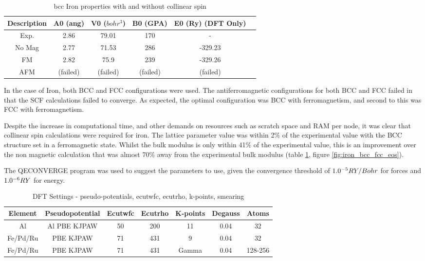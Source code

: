 \begin{table}[h]
\begin{center}
\renewcommand{\arraystretch}{1.2}
\begin{tabular}{c c c c c c}
\hline\hline
Description & A0 (ang) & V0 ($bohr^3$) & B0 (GPA) & E0 (Ry) (DFT Only) \\
\hline\hline
Exp. & 2.86 & 79.01 & 170 & - \\
No Mag & 2.77 & 71.53 & 286 & -329.23 \\
FM & 2.82 & 75.9 & 239 & -329.26 \\
AFM & (failed) & (failed) & (failed) & (failed) \\
\hline\hline
\end{tabular}
\end{center}
\caption{\acrshort{bcc} Iron properties with and without collinear spin}
\label{table:feproperties}
\end{table}

In the case of Iron, both BCC and FCC configurations were used.  The antiferromagnetic configurations for both BCC and FCC failed in that the SCF calculations failed to converge.  As expected, the optimal configuration was BCC with ferromagnetism, and second to this was FCC with ferromagnetism.

Despite the increase in computational time, and other demands on resources such as scratch space and RAM per node, it was clear that collinear spin calculations were required for iron.  The lattice parameter value was within 2\% of the experimental value with the BCC structure set in a ferromagnetic state.  Whilst the bulk modulus is only within 41\% of the experimental value, this is an improvement over the non magnetic calculation that was almost 70\% away from the experimental bulk modulus (table \ref{table:feproperties}, figure \ref{fig:iron_bcc_fcc_eos}).


The QECONVERGE program was used to suggest the parameters to use, given the convergence threshold of $1.0 \time 10^{-5} RY/Bohr$ for forces and $1.0 \time 10^{-6} RY$ for energy.

\begin{table}[h]
\begin{center}
\renewcommand{\arraystretch}{1.2}
\begin{tabular}{c c c c c c c}
\hline\hline
Element & Pseudopotential & Ecutwfc & Ecutrho & K-points & Degauss & Atoms\\
\hline\hline
Al & Al PBE KJPAW & 50 & 200 & 11 & 0.04 & 32\\
Fe/Pd/Ru & PBE KJPAW & 71 & 431 & 9 & 0.04 & 32 \\ 
Fe/Pd/Ru & PBE KJPAW & 71 & 431 & Gamma & 0.04 & 128-256 \\ 
\hline\hline
\end{tabular}
\end{center}
\caption{DFT Settings - pseudo-potentials, ecutwfc, ecutrho, k-points, smearing}
\label{table:dftsettingsa}
\end{table}
\FloatBarrier

